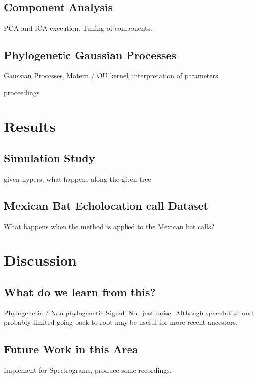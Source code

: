 \documentclass[wsdraft]{ws-rv9x6} %
\begin{document}
\subsection{Component Analysis}

PCA and ICA execution. Tuning of components.

\subsection{Phylogenetic Gaussian Processes}

Gaussian Processes, Matern / OU kernel, interpretation of parameters

proceedings 

\section{Results}

\subsection{Simulation Study}

given hypers, what happens along the given tree

\subsection{Mexican Bat Echolocation call Dataset}

What happens when the method is applied to the Mexican bat calls?

\section{Discussion}

\subsection{What do we learn from this?}

Phylogenetic / Non-phylogenetic Signal. Not just noise. Although speculative and probably limited going back to root may be useful for more recent ancestors.

\subsection{Future Work in this Area}

Implement for Spectrograms, produce some recordings.





\end{document}
